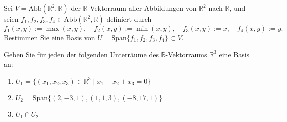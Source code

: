 \documentclass{../problemset}
\begin{document}
\begin{problem}
Sei $V = \text{Abb}(\mathbb{R}^2, \mathbb{R})$ der $\mathbb{R}$-Vektorraum aller Abbildungen von $\mathbb{R}^2$ nach $\mathbb{R}$, und seien $f_1, f_2, f_3, f_4 \in \text{Abb}(\mathbb{R}^2, \mathbb{R})$ definiert durch
\[ f_1(x, y) := \max(x, y), \quad f_2(x, y) := \min(x, y), \quad f_3(x, y) := x, \quad f_4(x, y) := y. \]
Bestimmen Sie eine Basis von $U = \text{Span}\{f_1, f_2, f_3, f_4\} \subset V$.
\end{problem}

\pagebreak

\begin{problem}
Geben Sie für jeden der folgenden Unterräume des $\mathbb{R}$-Vektorraums $\mathbb{R}^3$ eine Basis an:
\begin{enumerate}
    \item $U_1 = \{(x_1, x_2, x_3) \in \mathbb{R}^3 \mid x_1 + x_2 + x_3 = 0\}$
    \item $U_2 = \text{Span}\{(2, -3, 1), (1, 1, 3), (-8, 17, 1)\}$
    \item $U_1 \cap U_2$
\end{enumerate}
\end{problem}
\end{document}
